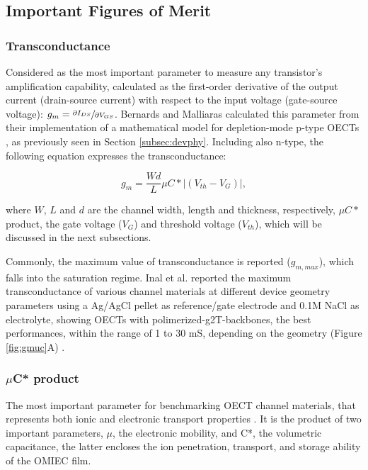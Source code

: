 \subsection{Important Figures of Merit}

\subsubsection{Transconductance}
Considered as the most important parameter to measure any transistor's amplification capability, calculated as the first-order derivative of the output current (drain-source current) with respect to the input voltage (gate-source voltage): $g_{m} = \sfrac{\partial I_{DS}}{\partial V_{GS}}$. Bernards and Malliaras calculated this parameter from their implementation of a mathematical model for depletion-mode p-type OECTs \cite{bernardsSteadyStateTransientBehavior2007}, as previously seen in Section \ref{subsec:devphy}. Including also n-type, the following equation expresses the transconductance: %

\begin{equation}\label{eq:gm}
	g_{m} = \frac{Wd}{L} \mu C* |(V_{th} - V_{G})|,
\end{equation}

where $W$, $L$ and $d$ are the channel width, length and thickness, respectively, $\mu C*$ product, the gate voltage ($V_{G}$) and threshold voltage ($V_{th}$), which will be discussed in the next subsections.

Commonly, the maximum value of transconductance is reported ($g_{m,max}$), which falls into the saturation regime. Inal et al. reported the maximum transconductance of various channel materials at different device geometry parameters using a Ag/AgCl pellet as reference/gate electrode and 0.1M NaCl as electrolyte, showing OECTs with polimerized-g2T-backbones, the best performances, within the range of 1 to 30 mS, depending on the geometry (Figure \ref{fig:gmuc}A) \cite{inalBenchmarkingOrganicMixed2017}.

\subsubsection{$\mu$C* product}

The most important parameter for benchmarking OECT channel materials, that represents both ionic and electronic transport properties %
\cite{inalBenchmarkingOrganicMixed2017}. %
It is the product of two important parameters, $\mu$, the electronic mobility, and C*, the volumetric capacitance, the latter encloses the ion penetration, transport, and storage ability of the OMIEC film.

